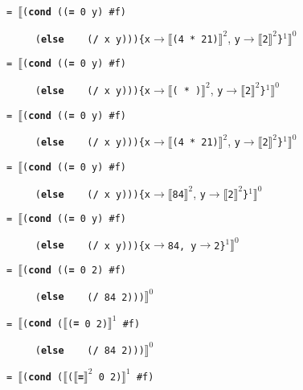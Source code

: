 \begin{minipage}{.8\linewidth}
	\texttt{= }$\llbracket$\texttt{(\textbf{cond} ((\textbf{=} 0 y)\ \#f)}\hfill{}

	\quad\texttt{\ \ \ \ \ (\textbf{else}\ \ \ \ (\textbf{/} x y)))\{x}$\to\llbracket$\texttt{(4 * 21)}$\rrbracket^2$, \texttt{y}$\to\llbracket$\texttt{2}$\rrbracket^2$\texttt{\}}$^1\rrbracket^0$

	\texttt{= }$\llbracket$\texttt{(\textbf{cond} ((\textbf{=} 0 y)\ \#f)}\hfill{}

	\quad\texttt{\ \ \ \ \ (\textbf{else}\ \ \ \ (\textbf{/} x y)))\{x}$\to\llbracket$\texttt{( )}$\rrbracket^2$, \texttt{y}$\to\llbracket$\texttt{2}$\rrbracket^2$\texttt{\}}$^1\rrbracket^0$

	\texttt{= }$\llbracket$\texttt{(\textbf{cond} ((\textbf{=} 0 y)\ \#f)}\hfill{}

	\quad\texttt{\ \ \ \ \ (\textbf{else}\ \ \ \ (\textbf{/} x y)))\{x}$\to\llbracket$\texttt{(4 * 21)}$\rrbracket^2$, \texttt{y}$\to\llbracket$\texttt{2}$\rrbracket^2$\texttt{\}}$^1\rrbracket^0$

	\texttt{= }$\llbracket$\texttt{(\textbf{cond} ((\textbf{=} 0 y)\ \#f)}\hfill{}

	\quad\texttt{\ \ \ \ \ (\textbf{else}\ \ \ \ (\textbf{/} x y)))\{x}$\to\llbracket$\texttt{84}$\rrbracket^2$, \texttt{y}$\to\llbracket$\texttt{2}$\rrbracket^2$\texttt{\}}$^1\rrbracket^0$

	\texttt{= }$\llbracket$\texttt{(\textbf{cond} ((\textbf{=} 0 y)\ \#f)}\hfill\reduction{$\cdot\to\cdot$}

	\quad\texttt{\ \ \ \ \ (\textbf{else}\ \ \ \ (\textbf{/} x y)))\{x}$\to$\texttt{84, y}$\to$\texttt{2\}}$^1\rrbracket^0$

	\texttt{= }$\llbracket$\texttt{(\textbf{cond} ((\textbf{=} 0 2)\ \#f)}\hfill{}

	\quad\texttt{\ \ \ \ \ (\textbf{else}\ \ \ \ (\textbf{/} 84 2)))}$\rrbracket^0$

	\texttt{= }$\llbracket$\texttt{(\textbf{cond} (}$\llbracket$\texttt{(\textbf{=} 0 2)}$\rrbracket^1$\texttt{\ \#f)}\hfill{}

	\quad\texttt{\ \ \ \ \ (\textbf{else}\ \ \ \ (\textbf{/} 84 2)))}$\rrbracket^0$

	\texttt{= }$\llbracket$\texttt{(\textbf{cond} (}$\llbracket$\texttt{(}$\llbracket$\texttt{\textbf{=}}$\rrbracket^2$\texttt{ 0 2)}$\rrbracket^1$\texttt{\ \#f)}\hfill{}


\end{minipage}
